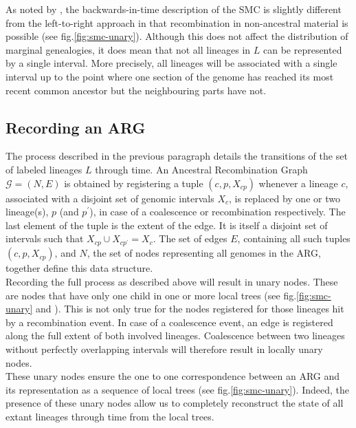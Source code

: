 \documentclass{article}
\begin{document}
As noted by \cite{mcvean_approximating_2005}, the backwards-in-time description of the 
SMC is slightly different from the left-to-right approach in that recombination 
in non-ancestral material is possible (see fig.\ref{fig:smc-unary}). 
Although this does not affect the distribution 
of marginal genealogies, it does mean that not all lineages in $L$ can be represented 
by a single interval. More precisely, all lineages will be associated with 
a single interval up to the point where one section of the 
genome has reached its most recent common ancestor but the neighbouring parts have not.

\subsection{Recording an ARG} \label{par:recording}

The process described in the previous paragraph details the transitions of the 
set of labeled lineages $L$ through time. An Ancestral Recombination Graph 
$\mathcal{G} = (N, E)$ is obtained by registering a tuple $(c, p, X_{cp})$ whenever a 
lineage $c$, associated with a disjoint set of genomic intervals $X_c$, is 
replaced by one or two lineage(s), $p$ (and $p^{\prime}$), 
in case of a coalescence or recombination respectively.
The last element of the tuple is the extent of the edge. It is itself a  
disjoint set of intervals such that $X_{cp} \cup X_{cp^{\prime}} = X_c$. 
The set of edges $E$, containing all such tuples $(c, p, X_{cp})$, 
and $N$, the set of nodes representing all genomes in the ARG, together
define this data structure.\\

Recording the full process as described above will result in unary nodes.
These are nodes that have only one child in one or more local trees 
(see fig.\ref{fig:smc-unary} and \citet{Wong-2023}). This is not only true 
for the nodes registered for those lineages hit by a recombination event. 
In case of a coalescence event, an edge is registered along the full 
extent of both involved lineages. 
Coalescence between two lineages without perfectly 
overlapping intervals will therefore result in locally unary nodes.\\

These unary nodes ensure the one to one correspondence between an ARG and its 
representation as a sequence of local trees (see fig.\ref{fig:smc-unary}). 
Indeed, the presence of these unary nodes allow us to completely reconstruct 
the state of all extant lineages through time from the local trees. 
\end{document}
